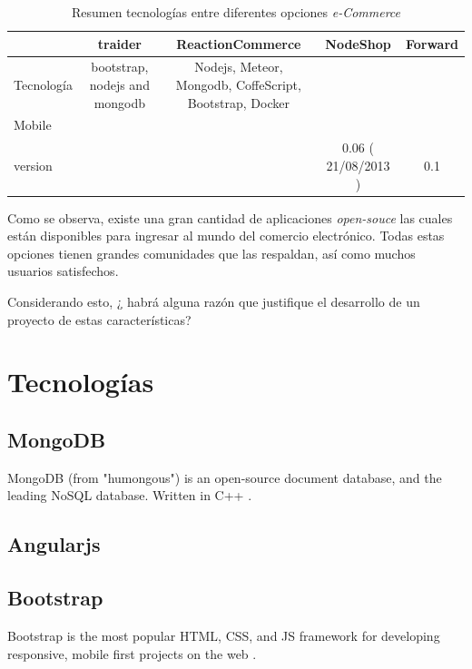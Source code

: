 \begin{table}[h!]
    \tiny
   
\begin{tabular}{ |l|c|c|c|c| }
\hline
	&
	traider\cite{online_Traider}&
	ReactionCommerce\cite{online_reactionCommerce}&
	NodeShop\cite{online_NodeShop}&
	Forward\cite{online_Forward}
 
\\ \hline
	Tecnología &
	bootstrap, nodejs and mongodb &
	Nodejs, Meteor, Mongodb, CoffeScript, Bootstrap, Docker&
	&
	

\\ \hline
	Mobile &
	&
	&
	&
\\ \hline
	version &
	&
	&
	0.06 ( 21/08/2013 )&
	0.1

\\ \hline
\end{tabular}
    \caption{ Resumen tecnologías entre diferentes opciones \textit{e-Commerce}}
    \label{tab:resume_technology_ecommerce}
\end{table}

Como se observa, existe una gran cantidad de aplicaciones \textit{open-souce} las cuales están disponibles para ingresar al mundo del comercio electrónico. Todas estas opciones tienen grandes comunidades que las respaldan, así como muchos usuarios satisfechos. 

Considerando esto, ¿ habrá alguna razón que justifique el desarrollo de un proyecto de estas características?

\section{Tecnologías }\label{cap:estadoArte:tecnologias}

	\subsection{MongoDB}
	MongoDB (from "humongous") is an open-source document database, and the leading NoSQL database. Written in C++ \cite{technology_mongodb}.
	
	\subsection{Angularjs}
	\cite{technology_angularjs}
	
	\subsection{Bootstrap}
	Bootstrap is the most popular HTML, CSS, and JS framework for developing responsive, mobile first projects on the web \cite{technology_bootstrap}.
	
